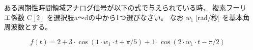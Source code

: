 ある周期性時間領域アナログ信号が以下の式で与えられている時、
複素フーリエ係数 $\textrm{C}[2]$ を選択肢a〜dの中から1つ選びなさい。
なお $w_1$ [rad/秒] を基本角周波数とする。

\[
f(t) = 
2
+ 3 \cdot \cos( 1 \cdot w_1 \cdot t + \pi/5 )
+ 1 \cdot \cos( 2 \cdot w_1 \cdot t - \pi/2 )
\]
